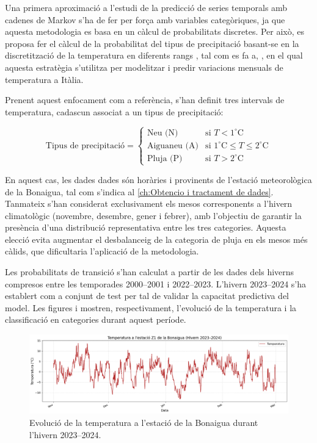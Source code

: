 \documentclass[../main.tex]{subfiles}
\begin{document}
Una primera aproximació a l'estudi de la predicció de series temporals amb cadenes de Markov s'ha de fer per força amb variables categòriques, ja que aquesta metodologia es basa en un càlcul de probabilitats discretes.  Per això,  es proposa fer el càlcul de la probabilitat del tipus de precipitació basant-se en la discretització de la temperatura en diferents rangs , tal com es fa a, \textcite{lefebvre2019markov}, en el qual aquesta estratègia s’utilitza per modelitzar i predir variacions mensuals de temperatura a Itàlia.

Prenent aquest enfocament com a referència, s’han definit tres intervals de temperatura, cadascun associat a un tipus de precipitació:

\begin{equation}
\text{Tipus de precipitació} =
\begin{cases}
\text{Neu (N)} & \text{si } T < 1^\circ\text{C} \\
\text{Aiguaneu (A)} & \text{si } 1^\circ\text{C} \leq T \leq 2^\circ\text{C} \\
\text{Pluja (P)} & \text{si } T > 2^\circ\text{C}
\end{cases}
\label{eq: Definició estats N,A,P}
\end{equation}


En aquest cas, les dades dades són horàries i provinents de l’estació meteorològica de la Bonaigua, tal com s’indica al \cref{ch:Obtencio i tractament de dades}. Tanmateix s'han considerat exclusivament els mesos corresponents a l’hivern climatològic (novembre, desembre, gener i febrer), amb l’objectiu de garantir la presència d’una distribució representativa entre les tres categories. Aquesta elecció evita augmentar el desbalanceig de la categoria de pluja en els mesos més càlids, que dificultaria l'aplicació de la metodologia.

Les probabilitats de transició s’han calculat a partir de les dades dels hiverns compresos entre les temporades 2000–2001 i 2022–2023. L’hivern 2023–2024 s’ha establert com a conjunt de test per tal de validar la capacitat predictiva del model. Les figures  i  mostren, respectivament, l’evolució de la temperatura i la classificació en categories durant aquest període.

\begin{figure}[H]
    \centering
    \includegraphics[width=\textwidth]{figures/markov/1.png}
    \caption{Evolució de la temperatura a l'estació de la Bonaigua durant l’hivern 2023–2024.}
    \label{fig:markov1}
\end{figure}
\end{document}
